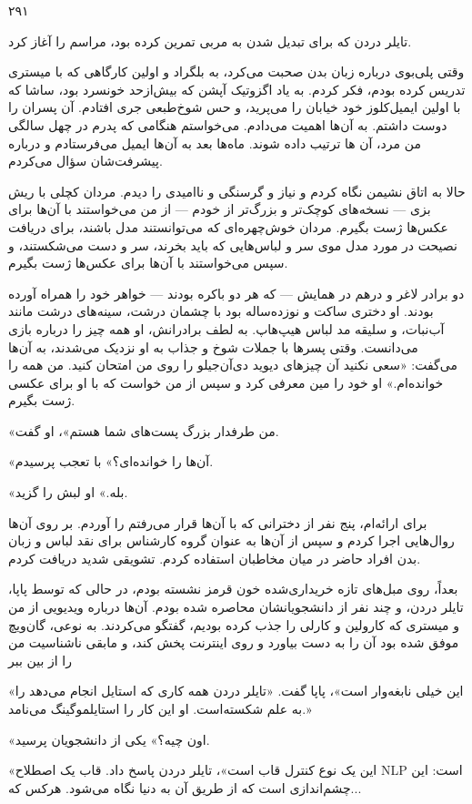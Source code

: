 \begin{flushright}
۲۹۱
\end{flushright}

تایلر دردن که برای تبدیل شدن به مربی تمرین کرده بود، مراسم را آغاز کرد.

وقتی پلی‌بوی درباره زبان بدن صحبت می‌کرد، به بلگراد و اولین کارگاهی که با میستری تدریس کرده بودم، فکر کردم. به یاد اگزوتیک آپشن که بیش‌ازحد خونسرد بود، ساشا که با اولین ایمیل‌کلوز خود خیابان را می‌پرید، و حس شوخ‌طبعی جری افتادم. آن پسران را دوست داشتم. به آن‌ها اهمیت می‌دادم. می‌خواستم هنگامی که پدرم در چهل سالگی من مرد، آن ها ترتیب داده شوند. ماه‌ها بعد به آن‌ها ایمیل می‌فرستادم و درباره پیشرفت‌شان سؤال می‌کردم.

حالا به اتاق نشیمن نگاه کردم و نیاز و گرسنگی و ناامیدی را دیدم. مردان کچلی با ریش بزی — نسخه‌های کوچک‌تر و بزرگ‌تر از خودم — از من می‌خواستند با آن‌ها برای عکس‌ها ژست بگیرم. مردان خوش‌چهره‌ای که می‌توانستند مدل باشند، برای دریافت نصیحت در مورد مدل موی سر و لباس‌هایی که باید بخرند، سر و دست می‌شکستند، و سپس می‌خواستند با آن‌ها برای عکس‌ها ژست بگیرم.

دو برادر لاغر و درهم در همایش — که هر دو باکره بودند — خواهر خود را همراه آورده بودند. او دختری ساکت و نوزده‌ساله بود با چشمان درشت، سینه‌های درشت مانند آب‌نبات، و سلیقه مد لباس هیپ‌هاپ. به لطف برادرانش، او همه چیز را درباره بازی می‌دانست. وقتی پسرها با جملات شوخ و جذاب به او نزدیک می‌شدند، به آن‌ها می‌گفت: «سعی نکنید آن چیزهای دیوید دی‌آن‌جیلو را روی من امتحان کنید. من همه را خوانده‌ام.» او خود را مین معرفی کرد و سپس از من خواست که با او برای عکسی ژست بگیرم.

«من طرفدار بزرگ پست‌های شما هستم»، او گفت.

«آن‌ها را خوانده‌ای؟» با تعجب پرسیدم.

«بله.» او لبش را گزید.

برای ارائه‌ام، پنج نفر از دخترانی که با آن‌ها قرار می‌رفتم را آوردم. بر روی آن‌ها روال‌هایی اجرا کردم و سپس از آن‌ها به عنوان گروه کارشناس برای نقد لباس و زبان بدن افراد حاضر در میان مخاطبان استفاده کردم. تشویقی شدید دریافت کردم.

بعداً، روی مبل‌های تازه خریداری‌شده خون قرمز نشسته بودم، در حالی که توسط پاپا، تایلر دردن، و چند نفر از دانشجویانشان محاصره شده بودم. آن‌ها درباره ویدیویی از من و میستری که کارولین و کارلی را جذب کرده بودیم، گفتگو می‌کردند. به نوعی، گان‌ویچ موفق شده بود آن را به دست بیاورد و روی اینترنت پخش کند، و مابقی ناشناسیت من را از بین ببر

«این خیلی نابغه‌وار است»، پاپا گفت. «تایلر دردن همه کاری که استایل انجام می‌دهد را به علم شکسته‌است. او این کار را استایلموگینگ می‌نامد.»

«اون چیه؟» یکی از دانشجویان پرسید.

«این یک نوع کنترل قاب است»، تایلر دردن پاسخ داد. قاب یک اصطلاح NLP است: این چشم‌اندازی است که از طریق آن به دنیا نگاه می‌شود. هرکس که...